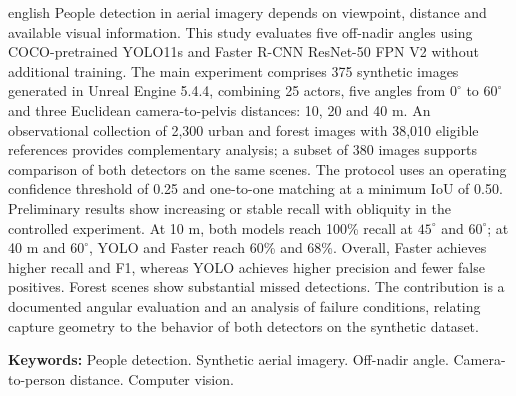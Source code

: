 \begin{resumo}[Abstract]
\begin{otherlanguage*}{english}
People detection in aerial imagery depends on viewpoint, distance and available visual information. This study evaluates five off-nadir angles using COCO-pretrained YOLO11s and Faster R-CNN ResNet-50 FPN V2 without additional training. The main experiment comprises 375 synthetic images generated in Unreal Engine 5.4.4, combining 25 actors, five angles from $0^\circ$ to $60^\circ$ and three Euclidean camera-to-pelvis distances: 10, 20 and 40 m. An observational collection of 2,300 urban and forest images with 38,010 eligible references provides complementary analysis; a subset of 380 images supports comparison of both detectors on the same scenes. The protocol uses an operating confidence threshold of 0.25 and one-to-one matching at a minimum IoU of 0.50. Preliminary results show increasing or stable recall with obliquity in the controlled experiment. At 10 m, both models reach 100\% recall at $45^\circ$ and $60^\circ$; at 40 m and $60^\circ$, YOLO and Faster reach 60\% and 68\%. Overall, Faster achieves higher recall and F1, whereas YOLO achieves higher precision and fewer false positives. Forest scenes show substantial missed detections. The contribution is a documented angular evaluation and an analysis of failure conditions, relating capture geometry to the behavior of both detectors on the synthetic dataset.
\par\vspace{\onelineskip}
\noindent\textbf{Keywords:} People detection. Synthetic aerial imagery. Off-nadir angle. Camera-to-person distance. Computer vision.
\end{otherlanguage*}
\end{resumo}
